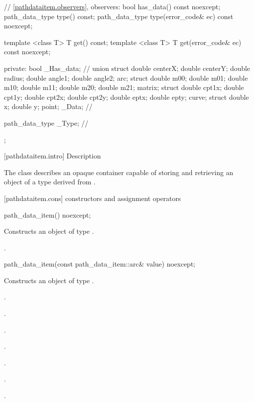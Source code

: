 \begin{codeblock}
{{{{{    // \ref{pathdataitem.observers}, observers:
    bool has_data() const noexcept;
    path_data_type type() const;
    path_data_type type(error_code& ec) const noexcept;

    template <class T>
    T get() const;
    template <class T>
    T get(error_code& ec) const noexcept;

  private:
    bool _Has_data;         // \expos
    union {
      struct {
        double centerX;
        double centerY;
        double radius;
        double angle1;
        double angle2;
      } arc;
      struct {
        double m00;
        double m01;
        double m10;
        double m11;
        double m20;
        double m21;
      } matrix;
      struct {
        double cpt1x;
        double cpt1y;
        double cpt2x;
        double cpt2y;
        double eptx;
        double epty;
      } curve;
      struct {
        double x;
        double y;
      } point;
    } _Data;               // \expos

    path_data_type _Type;  // \expos
  };
} } } }
\end{codeblock}

 [pathdataitem.intro] { Description}

\pnum
{}
The class  describes an opaque container capable of storing and retrieving an object of a type derived from .

 [pathdataitem.cons] { constructors and assignment operators}

\begin{itemdecl}
path_data_item() noexcept;
\end{itemdecl}
\begin{itemdescr}
\pnum
\effects
Constructs an object of type .

\pnum
\postconditions
{}.
\end{itemdescr}

\begin{itemdecl}
path_data_item(const path_data_item::arc& value) noexcept;
\end{itemdecl}
\begin{itemdescr}
\pnum
\effects
Constructs an object of type .

\pnum
\postconditions
{}.

\pnum
{}.

\pnum
{}.

\pnum
{}.

\pnum
{}.

\pnum
{}.

\pnum
{}.

\end{itemdescr}

